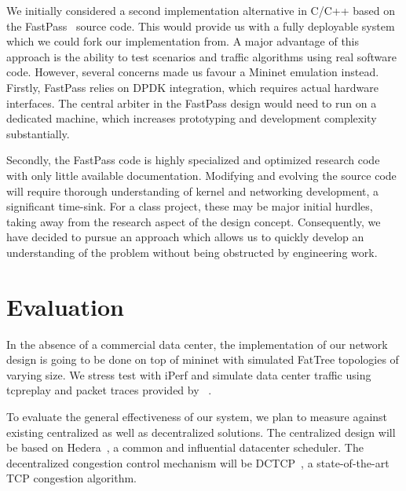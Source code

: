 \documentclass[sigconf]{acmart}
\begin{document}
We initially considered a second implementation alternative in C/C++ based on the FastPass~\cite{fastpass} source code. This would provide us with a fully deployable system which we could fork our implementation from. A major advantage of this approach is the ability to test scenarios and traffic algorithms using real software code.
However, several concerns made us favour a Mininet emulation instead.
Firstly, FastPass relies on DPDK integration, which requires actual hardware interfaces. The central arbiter in the FastPass design would need to run on a dedicated machine, which increases prototyping and development complexity substantially.

Secondly, the FastPass code is highly specialized and optimized research code with only little available documentation. Modifying and evolving the source code will require thorough understanding of kernel and networking development, a significant time-sink. For a class project, these may be major initial hurdles, taking away from the research aspect of the design concept.
Consequently, we have decided to pursue an approach which allows us to quickly develop an understanding of the problem without being obstructed by engineering work.


\section{Evaluation}
\label{sec:evaluation}

In the absence of a commercial data center, the implementation of our network design is going to be done on top of mininet with simulated FatTree topologies of varying size. We stress test with iPerf and simulate data center traffic using tcpreplay and packet traces provided by~\cite{traffic} .

To evaluate the general effectiveness of our system, we plan to measure against existing centralized as well as decentralized solutions.
The centralized design will be based on Hedera~\cite{hedera}, a common and influential datacenter scheduler. The decentralized congestion control mechanism will be DCTCP~\cite{dctcp}, a state-of-the-art TCP congestion algorithm.
\end{document}
